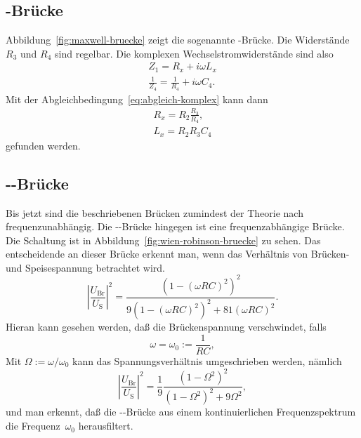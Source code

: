 \subsection{-Brücke}
Abbildung~\ref{fig:maxwell-bruecke} zeigt die sogenannte
-Brücke. Die Widerstände $R_3$ und $R_4$ sind regelbar.
Die komplexen Wechselstromwiderstände sind also
\begin{gather}
Z_1 = R_x + i \omega L_x\\
\frac{1}{Z_4} = \frac{1}{R_4} + i \omega C_4.
\end{gather}
Mit der Abgleichbedingung~\eqref{eq:abgleich-komplex} kann dann
\begin{gather}
R_x = R_2 \frac{R_3}{R_4},\\
L_x = R_2 R_3 C_4
\end{gather}
gefunden werden.

\subsection{--Brücke}

Bis jetzt sind die beschriebenen Brücken zumindest der Theorie nach
frequenzunabhängig. Die --Brücke hingegen
ist eine frequenzabhängige Brücke. Die Schaltung ist in
Abbildung~\ref{fig:wien-robinson-bruecke} zu sehen. Das entscheidende
an dieser Brücke erkennt man, wenn das Verhältnis von Brücken- und
Speisespannung betrachtet wird.
\begin{equation}
\left|\frac{U_\text{Br}}{U_\text{S}}\right|^2 = \frac{(1 - (\omega R
  C)^2)^2}{9(1 - (\omega R C)^2)^2 + 81 (\omega R C)^2}.
\end{equation}
Hieran kann gesehen werden, daß die Brückenspannung verschwindet,
falls 
\begin{equation}
\omega = \omega_0 := \frac{1}{RC}, 
\end{equation}
Mit $\Omega := \omega/\omega_0$ kann das Spannungsverhältnis
umgeschrieben werden, nämlich
\begin{equation}
\left|\frac{U_\text{Br}}{U_\text{S}}\right|^2 = \frac{1}{9} \frac{(1 -
  \Omega^2)^2}{(1 - \Omega^2)^2 + 9 \Omega^2},
\end{equation}
und man erkennt, daß die --Brücke aus einem
kontinuierlichen Frequenzspektrum die Frequenz~$\omega_0$
herausfiltert.

